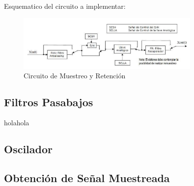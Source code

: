 Esquematico del circuito a implementar:
\begin{figure}[H]
    \centering
    \includegraphics[width=0.8\textwidth]{Imagenes/Circuito_Muestreo.png}
    \caption{Circuito de Muestreo y Retención}
    \label{fig:Circuito_Muestreo}
\end{figure}

\subsection{Filtros Pasabajos}
holahola

\subsection{Oscilador}

\subsection{Obtención de Señal Muestreada}

